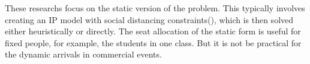 








These researchs focus on the static version of the problem. This typically involves creating an IP model with social distancing constraints(\cite{bortolete2022support, ghorbani2020model, haque2022optimization}), which is then solved either heuristically or directly. The seat allocation of the static form is useful for fixed people, for example, the students in one class. 
But it is not be practical for the dynamic arrivals in commercial events.




